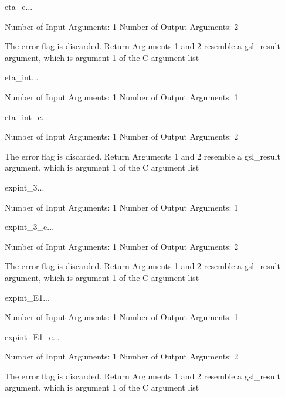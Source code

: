 \begin{funcdesc}{eta_e}{...}

    Number of Input  Arguments:  1
    Number of Output Arguments:  2

The error flag is discarded.
Return Arguments 1 and 2 resemble a gsl_result argument,
	which is  argument 1 of the C argument list

\end{funcdesc}

\begin{funcdesc}{eta_int}{...}

    Number of Input  Arguments:  1
    Number of Output Arguments:  1
\end{funcdesc}

\begin{funcdesc}{eta_int_e}{...}

    Number of Input  Arguments:  1
    Number of Output Arguments:  2

The error flag is discarded.
Return Arguments 1 and 2 resemble a gsl_result argument,
	which is  argument 1 of the C argument list

\end{funcdesc}

\begin{funcdesc}{expint_3}{...}

    Number of Input  Arguments:  1
    Number of Output Arguments:  1
\end{funcdesc}

\begin{funcdesc}{expint_3_e}{...}

    Number of Input  Arguments:  1
    Number of Output Arguments:  2

The error flag is discarded.
Return Arguments 1 and 2 resemble a gsl_result argument,
	which is  argument 1 of the C argument list

\end{funcdesc}

\begin{funcdesc}{expint_E1}{...}

    Number of Input  Arguments:  1
    Number of Output Arguments:  1
\end{funcdesc}

\begin{funcdesc}{expint_E1_e}{...}

    Number of Input  Arguments:  1
    Number of Output Arguments:  2

The error flag is discarded.
Return Arguments 1 and 2 resemble a gsl_result argument,
	which is  argument 1 of the C argument list

\end{funcdesc}

